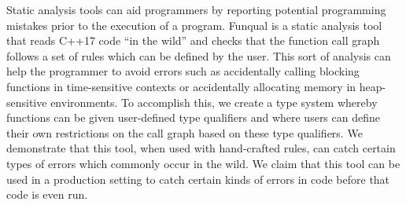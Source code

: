 Static analysis tools can aid programmers by reporting potential programming mistakes prior to the execution of a program.  Funqual is a static analysis tool that reads C++17 code ``in the wild'' and checks that the function call graph follows a set of rules which can be defined by the user.  This sort of analysis can help the programmer to avoid errors such as accidentally calling blocking functions in time-sensitive contexts or accidentally allocating memory in heap-sensitive environments.  To accomplish this, we create a type system whereby functions can be given user-defined type qualifiers and where users can define their own restrictions on the call graph based on these type qualifiers.  We demonstrate that this tool, when used with hand-crafted rules, can catch certain types of errors which commonly occur in the wild.  We claim that this tool can be used in a production setting to catch certain kinds of errors in code before that code is even run.  

